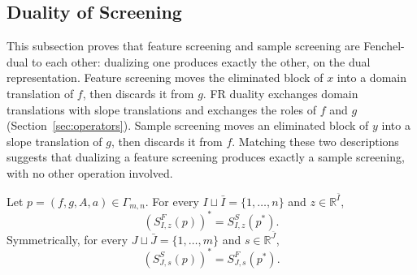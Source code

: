 \subsection{Duality of Screening}

This subsection proves that feature screening and sample screening are
Fenchel-dual to each other: dualizing one produces exactly the other,
on the dual representation. Feature screening moves the eliminated
block of \(x\) into a domain translation of \(f\), then discards it
from \(g\). FR duality exchanges domain translations
with slope translations and exchanges the roles of \(f\) and \(g\)
(Section~\ref{sec:operators}). Sample screening moves an eliminated
block of \(y\) into a slope translation of \(g\), then discards it
from \(f\). Matching these two descriptions suggests that dualizing a
feature screening produces exactly a sample screening, with no other
operation involved.

\begin{theorem}
\label{thm:duality}
Let \(p=(f,g,A,a)\in\Gamma_{m,n}\). For every
\(I\sqcup\bar I=\{1,\ldots,n\}\) and \(z\in\mathbb R^{\bar I}\),
\[
\left(S^{F}_{I,z}(p)\right)^*
=
S^{S}_{I,z}(p^*).
\]
Symmetrically, for every \(J\sqcup\bar J=\{1,\ldots,m\}\) and
\(s\in\mathbb R^{\bar J}\),
\[
\left(S^{S}_{J,s}(p)\right)^*
=
S^{F}_{J,s}(p^*).
\]
\end{theorem}

